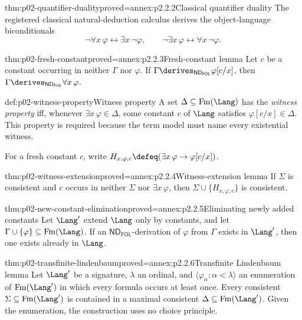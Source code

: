 \begin{hblemma}{thm:p02-quantifier-duality}{proved=annex:p2.2.2}{Classical quantifier duality}
The registered classical natural-deduction calculus derives the
object-language biconditionals
\[
 \neg\forall x\,\varphi\leftrightarrow\exists x\,\neg\varphi,
 \qquad
 \neg\exists x\,\varphi\leftrightarrow\forall x\,\neg\varphi.
\]
\end{hblemma}

\begin{hblemma}{thm:p02-fresh-constant}{proved=annex:p2.2.3}{Fresh-constant lemma}
Let \(c\) be a constant occurring in neither \(\Gamma\) nor \(\varphi\).
If
\(\Gamma\derives_{\mathsf{ND}_{\mathsf{FOL}}}\varphi[c/x]\), then
\(\Gamma\derives_{\mathsf{ND}_{\mathsf{FOL}}}\forall x\,\varphi\).
\end{hblemma}

\begin{hbdefinition}{def:p02-witness-property}{Witness property}
A set \(\Delta\subseteq\operatorname{Fm}(\Lang)\) has the
\emph{witness property} iff, whenever
\(\exists x\,\varphi\in\Delta\), some constant \(c\) of \(\Lang\)
satisfies \(\varphi[c/x]\in\Delta\).  This property is required because
the term model must name every existential witness.
\end{hbdefinition}

For a fresh constant \(c\), write
\(H_{x,\varphi,c}\defeq
  (\exists x\,\varphi\to\varphi[c/x])\).

\begin{hblemma}{thm:p02-witness-extension}{proved=annex:p2.2.4}{Witness-extension lemma}
If \(\Sigma\) is consistent and \(c\) occurs in neither \(\Sigma\) nor
\(\exists x\,\varphi\), then
\(\Sigma\cup\{H_{x,\varphi,c}\}\) is consistent.
\end{hblemma}

\begin{hblemma}{thm:p02-new-constant-elimination}{proved=annex:p2.2.5}{Eliminating newly added constants}
Let \(\Lang'\) extend \(\Lang\) only by constants, and let
\(\Gamma\cup\{\varphi\}\subseteq\operatorname{Fm}(\Lang)\).  If an
\(\mathsf{ND}_{\mathsf{FOL}}\)-derivation of \(\varphi\) from \(\Gamma\)
exists in \(\Lang'\), then one exists already in \(\Lang\).
\end{hblemma}

\begin{hblemma}{thm:p02-transfinite-lindenbaum}{proved=annex:p2.2.6}{Transfinite Lindenbaum lemma}
Let \(\Lang'\) be a signature, \(\lambda\) an ordinal, and
\(\langle\varphi_\alpha:\alpha<\lambda\rangle\) an enumeration of
\(\operatorname{Fm}(\Lang')\) in which every formula occurs at least once.
Every consistent \(\Sigma\subseteq\operatorname{Fm}(\Lang')\) is contained in
a maximal consistent \(\Delta\subseteq\operatorname{Fm}(\Lang')\).  Given the
enumeration, the construction uses no choice principle.
\end{hblemma}

